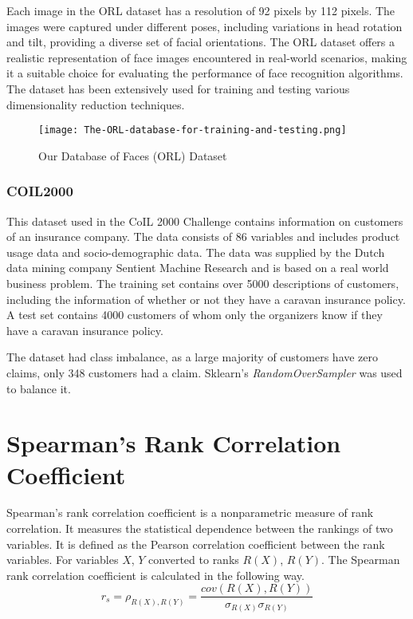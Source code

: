 Each image in the ORL dataset has a resolution of 92 pixels by 112 pixels. The images were captured under different poses, including variations in head rotation and tilt, providing a diverse set of facial orientations. The ORL dataset offers a realistic representation of face images encountered in real-world scenarios, making it a suitable choice for evaluating the performance of face recognition algorithms. The dataset has been extensively used for training and testing various dimensionality reduction techniques.

\begin{figure}
    \centering
    \texttt{[image: The-ORL-database-for-training-and-testing.png]}
    \caption{Our Database of Faces (ORL) Dataset}
    \label{fig:orl_faces}
\end{figure}

\subsubsection{COIL2000}\label{section:coil-dataset}
This dataset used in the CoIL 2000 Challenge contains information on customers of an insurance company. The data consists of 86 variables and includes product usage data and socio-demographic data. The data was supplied by the Dutch data mining company Sentient Machine Research and is based on a real world business problem. The training set contains over 5000 descriptions of customers, including the information of whether or not they have a caravan insurance policy. A test set contains 4000 customers of whom only the organizers know if they have a caravan insurance policy.

The dataset had class imbalance, as a large majority of customers have zero claims, only 348 customers had a claim. Sklearn's \textit{RandomOverSampler} was used to balance it.

\section{Spearman's Rank Correlation Coefficient} \label{section:spearman}
Spearman's rank correlation coefficient is a nonparametric measure of rank correlation. It measures the statistical dependence between the rankings of two variables. It is defined as the Pearson correlation coefficient between the rank variables. For variables $X$, $Y$ converted to ranks $R(X)$, $R(Y)$. The Spearman rank correlation coefficient is calculated in the following way.
\begin{equation}
    r_s = \rho_{R(X), R(Y)} = \frac{cov(R(X),R(Y))}{\sigma_{R(X)} \sigma_{R(Y)}}
\end{equation}


